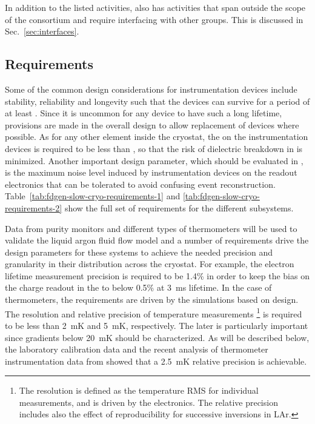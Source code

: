 In addition to the listed activities,  also has activities that span outside the scope of the consortium and require interfacing with other groups. This is discussed in Sec.~\ref{sec:interfaces}.

\subsection{Requirements}

Some of the common design considerations for instrumentation devices include stability, reliability and longevity such that the devices can survive for a period of at least \dunelifetime. Since it is uncommon for any device to have such a long lifetime, provisions are made in the overall design to allow replacement of devices where possible. As for any other element inside the cryostat, the \efield  on the instrumentation devices is required to be less than \localefield, so that the risk of dielectric breakdown in  is minimized. Another important design parameter, which should be evaluated in , is the maximum noise level induced by instrumentation devices on the readout electronics that can be tolerated to avoid confusing event reconstruction. Table~\ref{tab:fdgen-slow-cryo-requirements-1} and \ref{tab:fdgen-slow-cryo-requirements-2} show the full set of requirements for the different  subsystems.

Data from purity monitors and different types of thermometers will be used to validate the liquid argon fluid flow model and a number of requirements drive the design parameters for these systems to achieve the needed precision and granularity in their distribution across the cryostat. For example, the electron lifetime measurement precision is required to be 1.4\% in order to keep the bias on the charge readout in the  to below 0.5\% at 3~ms lifetime. In the case of thermometers, the requirements are driven by the  simulations based on  design. The resolution and relative precision of temperature measurements
\footnote{The resolution is defined as the temperature RMS for individual measurements, and is driven by the electronics. The relative precision includes also the effect of reproducibility for successive inversions in LAr.}
is required to be less than 2~mK and 5~mK, respectively. The later is particularly important since gradients below 20~mK should be characterized.  
As will be described below, the laboratory calibration data and the recent analysis of thermometer instrumentation data from  showed that a 2.5~mK relative precision is achievable. 

